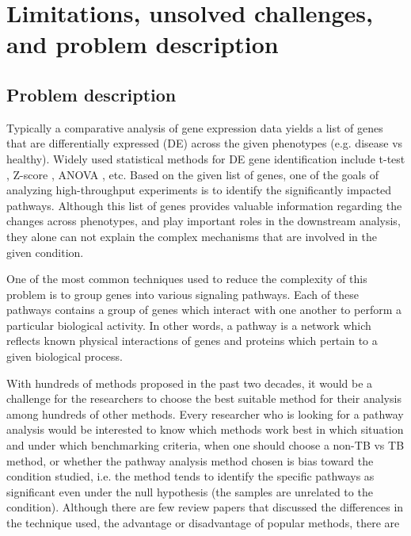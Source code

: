 \section{Limitations, unsolved challenges, \newline and problem description}
\label{chap:ProblemDescription}


\clearpage

\subsection{Problem description}

Typically a comparative analysis of gene expression data yields a list of genes that are differentially expressed (DE) across the given phenotypes (e.g. disease vs healthy).
Widely used statistical methods for DE gene identification include t-test \cite{Tian:2005}, Z-score \cite{kim2005page}, ANOVA \cite{al2005discovering}, etc. Based on the given list of genes, one of the goals of analyzing high-throughput experiments is to identify the significantly impacted pathways.
Although this list of genes provides valuable information regarding the changes across phenotypes, and play important roles in the downstream analysis, they alone can not explain the complex mechanisms that are involved in the given condition.

One of the most common techniques used to reduce the complexity of this problem is to group  genes into various signaling pathways.
Each of these pathways contains a group of genes which interact with one another to perform a particular biological activity. 
In other words, a pathway is a network which reflects known physical interactions of genes and proteins which pertain to a given biological process.

With hundreds of methods proposed in the past two decades, it would be a challenge for the researchers to choose the best suitable method for their analysis among hundreds of other methods.
Every researcher who is looking for a pathway analysis would be interested to know which methods work best in which situation and under which benchmarking criteria, when one should choose a non-TB vs TB method, or whether the pathway analysis method chosen is bias toward the condition studied, i.e. the method tends to identify the specific pathways as significant even under the null hypothesis (the samples are unrelated to the condition).
Although there are few review papers that discussed the differences in the technique used, the advantage or disadvantage of popular methods, there are 


